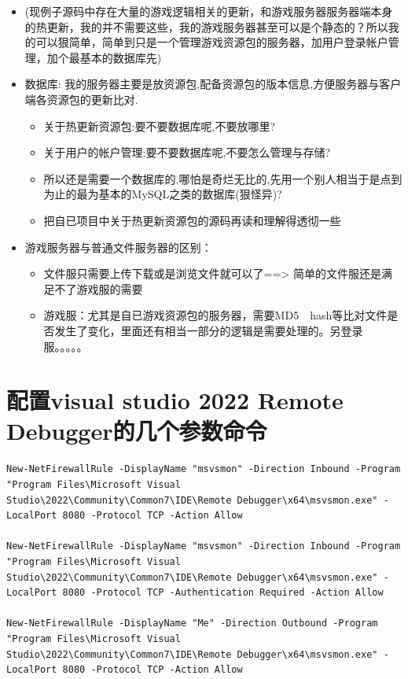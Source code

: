 \documentclass[9pt, b5paper]{article}
\begin{document}
\begin{itemize}
\begin{itemize}
\end{itemize}
\item (现例子源码中存在大量的游戏逻辑相关的更新，和游戏服务器服务器端本身的热更新，我的并不需要这些，我的游戏服务器甚至可以是个静态的？所以我的可以狠简单，简单到只是一个管理游戏资源包的服务器，加用户登录帐户管理，加个最基本的数据库先)
\item 数据库: 我的服务器主要是放资源包,配备资源包的版本信息,方便服务器与客户端各资源包的更新比对.
\begin{itemize}
\item 关于热更新资源包:要不要数据库呢,不要放哪里?
\item 关于用户的帐户管理:要不要数据库呢,不要怎么管理与存储?
\item 所以还是需要一个数据库的,哪怕是奇烂无比的,先用一个别人相当于是点到为止的最为基本的MySQL之类的数据库(狠怪异)?
\item 把自已项目中关于热更新资源包的源码再读和理解得透彻一些
\end{itemize}
\item 游戏服务器与普通文件服务器的区别：
\begin{itemize}
\item 文件服只需要上传下载或是浏览文件就可以了==> 简单的文件服还是满足不了游戏服的需要
\item 游戏服：尤其是自已游戏资源包的服务器，需要MD5　hash等比对文件是否发生了变化，里面还有相当一部分的逻辑是需要处理的。另登录服。。。。。
\end{itemize}
\end{itemize}
\section{配置visual studio 2022 Remote Debugger的几个参数命令}
\label{sec-5}
\begin{verbatim}
New-NetFirewallRule -DisplayName "msvsmon" -Direction Inbound -Program "Program Files\Microsoft Visual Studio\2022\Community\Common7\IDE\Remote Debugger\x64\msvsmon.exe" -LocalPort 8080 -Protocol TCP -Action Allow

New-NetFirewallRule -DisplayName "msvsmon" -Direction Inbound -Program "Program Files\Microsoft Visual Studio\2022\Community\Common7\IDE\Remote Debugger\x64\msvsmon.exe" -LocalPort 8080 -Protocol TCP -Authentication Required -Action Allow

New-NetFirewallRule -DisplayName "Me" -Direction Outbound -Program "Program Files\Microsoft Visual Studio\2022\Community\Common7\IDE\Remote Debugger\x64\msvsmon.exe" -LocalPort 8080 -Protocol TCP -Action Allow
\end{verbatim}
\end{document}
